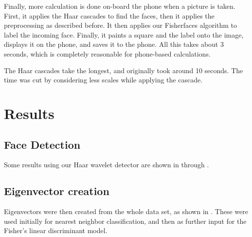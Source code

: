 Finally, more calculation is done on-board the phone when a picture is
taken.  First, it applies the Haar cascades to find the faces, then it
applies the preprocessing as described before. It then applies our
Fisherfaces algorithm to label the incoming face.  Finally, it paints
a square and the label onto the image, displays it on the phone, and
saves it to the phone.  All this takes about 3 seconds, which is
completely reasonable for phone-based calculations.

The Haar cascades take the longest, and originally took around 10
seconds.  The time was cut by considering less scales while applying
the cascade.



\section{Results}

\subsection{Face Detection}

Some results using our Haar wavelet detector are shown in
 through .




\subsection{Eigenvector creation}

Eigenvectors were then created from the whole data set, as shown in
.  These were used initially for nearest neighbor
classification, and then as further input for the Fisher's linear
discriminant model.




%


